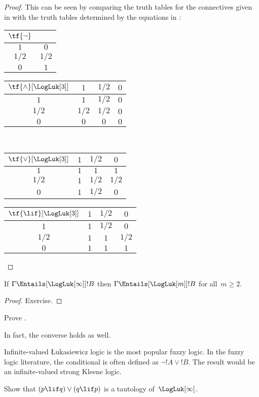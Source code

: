 \documentclass[../../../include/open-logic-section]{subfiles}
\begin{document}
\begin{proof}
  This can be seen by comparing the truth tables for the connectives
  given in  with the truth tables
  determined by the equations in :
  \begin{center}
    \begin{tabular}{c|c} 
      $\tf{\lnot}$ & \\ 
      \hline  
      $1$ & $0$ \\ 
      $1/2$ & $1/2$ \\
      $0$ & $1$ 
    \end{tabular}
    \quad
    \begin{tabular}{c|ccc} 
      $\tf{\land}[\LogLuk[3]]$ & $1$ & $1/2$ & $0$ \\ 
      \hline 
      $1$ & $1$ & $1/2$ & $0$ \\ 
      $1/2$ & $1/2$ & $1/2$ & $0$\\ 
      $0$ & $0$ & $0$ & $0$ 
    \end{tabular}
    \\[2ex]
    \begin{tabular}{c|ccc} 
      $\tf{\lor}[\LogLuk[3]]$ & $1$ & $1/2$ & $0$ \\ 
      \hline 
      $1$ & $1$ & $1$ & $1$ \\ 
      $1/2$ & $1$ & $1/2$ & $1/2$ \\
      $0$ & $1$ & $1/2$ & $0$ 
    \end{tabular}
    \quad
    \begin{tabular}{c|ccc} 
      $\tf{\lif}[\LogLuk[3]]$ & $1$ & $1/2$ & $0$ \\ 
      \hline 
      $1$ & $1$ & $1/2$ & $0$ \\ 
      $1/2$ & $1$ & $1$ & $1/2$  \\ 
      $0$ & $1$ & $1$ & $1$ 
    \end{tabular}
  \end{center} 
\end{proof}

\begin{prop}
  If $\Gamma \Entails[\LogLuk[\infty]] !B$ then $\Gamma
  \Entails[\LogLuk[m]] !B$ for all~$m \ge 2$.
\end{prop}

\begin{proof}
  Exercise.
\end{proof}

\begin{prob}
  Prove .
\end{prob}

In fact, the converse holds as well.

Infinite-valued \L ukasiewicz logic is the most popular fuzzy logic.
In the fuzzy logic literature, the conditional is often defined as
$\lnot !A \lor !B$. The result would be an infinite-valued strong
Kleene logic.

\begin{prob}
  Show that $(p \lif q) \lor (q \lif p)$ is a
  tautology of~$\LogLuk[\infty]$.
\end{prob}
\end{document}
